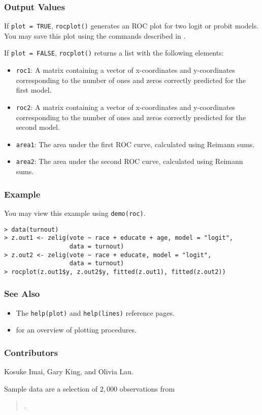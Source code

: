 \subsubsection{Output Values}

If {\tt plot = TRUE}, {\tt rocplot()} generates an ROC plot for two
logit or probit models.  You may save this plot using the commands
described in .

If {\tt plot = FALSE}, {\tt rocplot()} returns a list with the following
elements:
\begin{itemize}
\item {\tt roc1}:  A matrix containing a vector of x-coordinates and
  y-coordinates corresponding to the number of ones and zeros correctly
  predicted for the first model.
\item {\tt roc2}:  A matrix containing a vector of x-coordinates and
  y-coordinates corresponding to the number of ones and zeros correctly
  predicted for the second model.
\item {\tt area1}:  The area under the first ROC curve, calculated using
  Reimann sums.
\item {\tt area2}:  The area under the second ROC curve, calculated using
  Reimann sums.
\end{itemize}

\subsubsection{Example}
You may view this example using {\tt demo(roc)}.  
\begin{verbatim}
> data(turnout)
> z.out1 <- zelig(vote ~ race + educate + age, model = "logit", 
                  data = turnout)
> z.out2 <- zelig(vote ~ race + educate, model = "logit", 
                  data = turnout)
> rocplot(z.out1$y, z.out2$y, fitted(z.out1), fitted(z.out2))
\end{verbatim}

\subsubsection{See Also}
\begin{itemize}
  \item The {\tt help(plot)} and {\tt help(lines)} reference pages.  
  \item {} for an overview of plotting procedures.
\end{itemize}

\subsubsection{Contributors}

Kosuke Imai, Gary King, and Olivia Lau.  

Sample data are a selection of $2,000$ observations from
\begin{verse}
.  
\end{verse}


